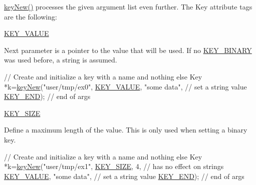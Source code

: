 \hyperlink{group__key_gad23c65b44bf48d773759e1f9a4d43b89}{key\-New()} processes the given argument list even further. The Key attribute tags are the following\-:
\begin{DoxyItemize}
\item \hyperlink{group__key_gga91fb3178848bd682000958089abbaf40ac66e4a49d09212b79f5754ca6db5bd2e}{K\-E\-Y\-\_\-\-V\-A\-L\-U\-E} \par
 Next parameter is a pointer to the value that will be used. If no \hyperlink{group__key_gga91fb3178848bd682000958089abbaf40a1ca18d4e094ae7487d35ecedda2235ff}{K\-E\-Y\-\_\-\-B\-I\-N\-A\-R\-Y} was used before, a string is assumed. 
\begin{DoxyCodeInclude}
\textcolor{comment}{// Create and initialize a key with a name and nothing else}
Key *k=\hyperlink{group__key_gad23c65b44bf48d773759e1f9a4d43b89}{keyNew}(\textcolor{stringliteral}{"user/tmp/ex0"},
        \hyperlink{group__key_gga91fb3178848bd682000958089abbaf40ac66e4a49d09212b79f5754ca6db5bd2e}{KEY\_VALUE}, \textcolor{stringliteral}{"some data"},    \textcolor{comment}{// set a string value}
        \hyperlink{group__key_gga91fb3178848bd682000958089abbaf40aa8adb6fcb92dec58fb19410eacfdd403}{KEY\_END});                  \textcolor{comment}{// end of args}
\end{DoxyCodeInclude}

\item \hyperlink{group__key_gga91fb3178848bd682000958089abbaf40a6d531b5c41445d19d0452eebdccbfa01}{K\-E\-Y\-\_\-\-S\-I\-Z\-E} \par
 Define a maximum length of the value. This is only used when setting a binary key. 
\begin{DoxyCodeInclude}
\textcolor{comment}{// Create and initialize a key with a name and nothing else}
Key *k=\hyperlink{group__key_gad23c65b44bf48d773759e1f9a4d43b89}{keyNew}(\textcolor{stringliteral}{"user/tmp/ex1"},
        \hyperlink{group__key_gga91fb3178848bd682000958089abbaf40a6d531b5c41445d19d0452eebdccbfa01}{KEY\_SIZE}, 4,               \textcolor{comment}{// has no effect on strings}
        \hyperlink{group__key_gga91fb3178848bd682000958089abbaf40ac66e4a49d09212b79f5754ca6db5bd2e}{KEY\_VALUE}, \textcolor{stringliteral}{"some data"},    \textcolor{comment}{// set a string value}
        \hyperlink{group__key_gga91fb3178848bd682000958089abbaf40aa8adb6fcb92dec58fb19410eacfdd403}{KEY\_END});                  \textcolor{comment}{// end of args}
\end{DoxyCodeInclude}


\end{DoxyItemize}
